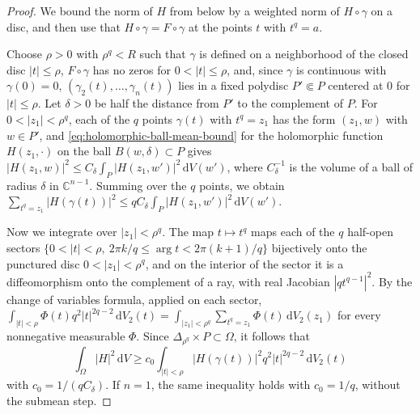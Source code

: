 \begin{proof}
We bound the norm of $H$ from below by a weighted norm of $H\circ\gamma$ on a disc, and then use that $H\circ\gamma=F\circ\gamma$ at the points $t$ with $t^q=a$.

Choose $\rho>0$ with $\rho^q<R$ such that $\gamma$ is defined on a neighborhood of the closed disc $|t|\leq\rho$, $F\circ\gamma$ has no zeros for $0<|t|\leq\rho$, and, since $\gamma$ is continuous with $\gamma(0)=0$, $(\gamma_2(t),\ldots,\gamma_n(t))$ lies in a fixed polydisc $P'\Subset P$ centered at $0$ for $|t|\leq\rho$. Let $\delta>0$ be half the distance from $P'$ to the complement of $P$. For $0<|z_1|<\rho^q$, each of the $q$ points $\gamma(t)$ with $t^q=z_1$ has the form $(z_1,w)$ with $w\in P'$, and \eqref{eq:holomorphic-ball-mean-bound} for the holomorphic function $H(z_1,\cdot)$ on the ball $B(w,\delta)\subset P$ gives $|H(z_1,w)|^2\leq C_\delta\int_P|H(z_1,w')|^2\,\mathrm dV(w')$, where $C_\delta^{-1}$ is the volume of a ball of radius $\delta$ in $\mathbb C^{n-1}$. Summing over the $q$ points, we obtain $\sum_{t^q=z_1}|H(\gamma(t))|^2\leq qC_\delta\int_P|H(z_1,w')|^2\,\mathrm dV(w')$.

Now we integrate over $|z_1|<\rho^q$. The map $t\mapsto t^q$ maps each of the $q$ half-open sectors $\{0<|t|<\rho,\ 2\pi k/q\leq\arg t<2\pi(k+1)/q\}$ bijectively onto the punctured disc $0<|z_1|<\rho^q$, and on the interior of the sector it is a diffeomorphism onto the complement of a ray, with real Jacobian $|qt^{q-1}|^2$. By the change of variables formula, applied on each sector, $\int_{|t|<\rho}\Phi(t)q^2|t|^{2q-2}\,\mathrm dV_2(t)=\int_{|z_1|<\rho^q}\sum_{t^q=z_1}\Phi(t)\,\mathrm dV_2(z_1)$ for every nonnegative measurable $\Phi$. Since $\Delta_{\rho^q}\times P\subset\Omega$, it follows that
\[
 \int_\Omega|H|^2\,\mathrm dV
 \geq c_0\int_{|t|<\rho}|H(\gamma(t))|^2
                           q^2|t|^{2q-2}\,\mathrm dV_2(t)
\]
with $c_0=1/(qC_\delta)$. If $n=1$, the same inequality holds with $c_0=1/q$, without the submean step.


\end{proof}

